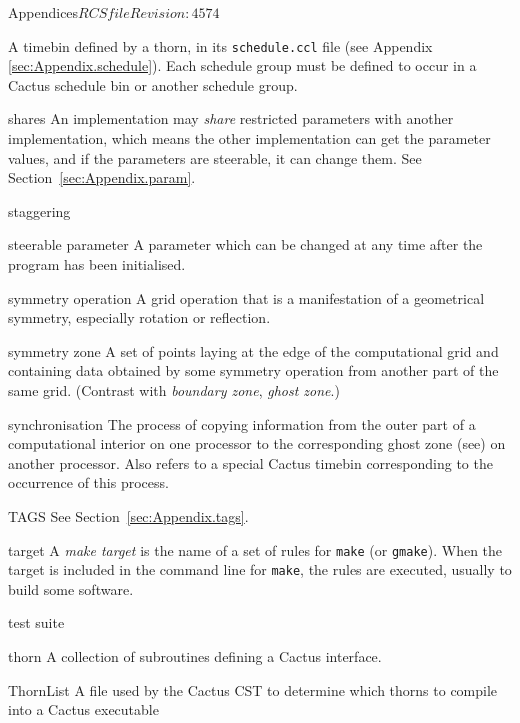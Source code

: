 \begin{cactuspart}{Appendices}{$RCSfile$}{$Revision: 4574 $}
\begin{Lentry}
  A timebin defined by a thorn, in its {\tt schedule.ccl} file (see
  Appendix \ref{sec:Appendix.schedule}).
  Each schedule group must be defined to occur in a Cactus schedule bin or
  another schedule group.  
\item[shares] An implementation may \textit{share} restricted parameters
  with another implementation, which means the other implementation can
  get the parameter values, and if the parameters are steerable, it can
  change them.
  See Section~\ref{sec:Appendix.param}.
\item[staggering]
\item[steerable parameter]
  A parameter which can be changed at any time after the program has been
  initialised.%
\item[symmetry operation]
  A grid operation that is a manifestation of a geometrical symmetry,
  especially rotation or reflection.
\item[symmetry zone]
  A set of points laying at the edge of the computational grid and
  containing data obtained by some symmetry operation from
  another part of the same grid.
  (Contrast with \textit{boundary zone}, \textit{ghost zone}.)
\item[synchronisation]
  The process of copying information from the outer part of a 
  computational interior on one processor to the corresponding ghost zone 
  (see) on another processor.  Also refers to a special Cactus timebin
  corresponding to the occurrence of this process. 
\item[TAGS]
  See Section~\ref{sec:Appendix.tags}.
\item[target]
  A \textit{make target} is the name of a set of rules for 
  \texttt{make} (or \texttt{gmake}).  When the target is included in the
  command line for \texttt{make}, the rules are executed, usually to
  build some software.
\item[test suite]
\item[thorn]
  A collection of subroutines defining a Cactus interface.  
\item[ThornList]
  A file used by the Cactus CST to determine which thorns to compile 
  into a Cactus executable

\end{Lentry}
\end{cactuspart}
